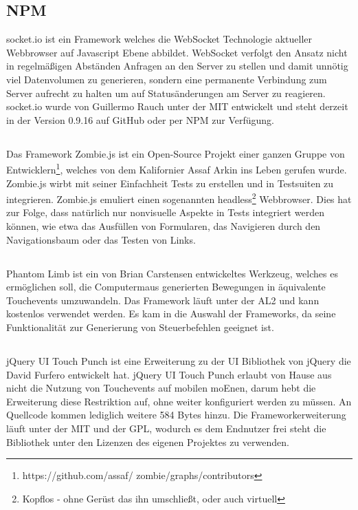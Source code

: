 	\subsection{NPM }
	socket.io ist ein \Gls{Framework} welches die WebSocket Technologie aktueller \Gls{Webbrowser} auf \Gls{Javascript} Ebene abbildet. WebSocket verfolgt den Ansatz nicht in regelmäßigen Abständen Anfragen an den Server zu stellen und damit unnötig viel Datenvolumen zu generieren, sondern eine permanente Verbindung zum Server aufrecht zu halten um auf Statusänderungen am Server zu reagieren. socket.io wurde von Guillermo Rauch unter der \Gls{MIT} entwickelt und steht derzeit in der Version 0.9.16 auf GitHub oder per \Gls{NPM} zur Verfügung.
	
	\subsection{}
	Das \Gls{Framework} Zombie.js ist ein Open-Source Projekt einer ganzen Gruppe von Entwicklern\footnote{https://github.com/assaf/	zombie/graphs/contributors}, welches von dem Kalifornier Assaf Arkin ins Leben gerufen wurde. Zombie.js wirbt mit 	seiner Einfachheit \Gls{Test}s zu erstellen und in \Gls{Test}suiten zu integrieren. Zombie.js emuliert einen sogenannten headless\footnote{Kopflos - ohne Gerüst das ihn umschließt, oder auch virtuell} \Gls{Webbrowser}. Dies hat zur Folge, dass natürlich nur nonvisuelle Aspekte in \Gls{Test}s integriert werden können, wie etwa das Ausfüllen von Formularen, das Navigieren durch den Navigationsbaum oder das Testen von Links.

	\subsection{}
	Phantom Limb ist ein von Brian Carstensen entwickeltes Werkzeug, welches es ermöglichen soll, die \Gls{Computer}maus generierten Bewegungen in äquivalente \mbox{Touchevents} umzuwandeln. Das \Gls{Framework} läuft unter der \Gls{AL2} und kann kostenlos 	verwendet werden. Es kam in die Auswahl der \Gls{Framework}s, da seine Funktionalität zur Generierung von Steuerbefehlen geeignet ist.
	
	\subsection{}
	jQuery UI Touch Punch ist eine Erweiterung zu der UI Bibliothek von jQuery die David Furfero entwickelt hat. jQuery UI Touch Punch erlaubt von Hause aus nicht die Nutzung von Touchevents auf mobilen \Gls{moEn}en, darum hebt die Erweiterung diese Restriktion auf, ohne weiter konfiguriert werden zu müssen. An Quellcode kommen lediglich weitere 584 Bytes hinzu. Die \Gls{Framework}erweiterung läuft unter der MIT und der \Gls{GPL}, wodurch es dem Endnutzer frei steht die Bibliothek unter den Lizenzen des eigenen Projektes zu verwenden.
	

